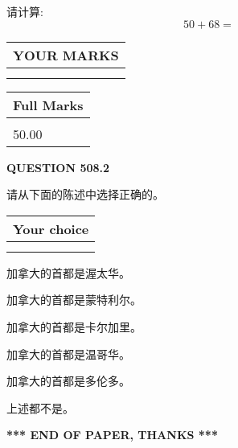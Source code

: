 \documentclass{ctexart}
\begin{document}
  
 
请计算:
\begin{equation}
50 +  %
68 = \nonumber
\end{equation}
 

 

 
  
\vspace{0.2in}
  
\noindent\begin{tabular}{|l|}
\hline
 YOUR MARKS  \\
\hline
 \\ 
 \\ 
\hline
\end{tabular}
\hspace{0.05in} \begin{tabular}{|l|}
\hline
 Full Marks  \\
\hline
 \\ 
50.00 \\
\hline
\end{tabular}
{\textbf{\Large{QUESTION
508.2 
}}}
  
  
请从下面的陈述中选择正确的。
  
  
\noindent\hspace{3.0in} \begin{tabular}{|l|}
\hline
Your choice \\
\hline
 \\ 
 \\ 
\hline
\end{tabular}
  
  
 
 
加拿大的首都是渥太华。
 
 
加拿大的首都是蒙特利尔。
 
 
加拿大的首都是卡尔加里。
 
 
加拿大的首都是温哥华。
 
 
加拿大的首都是多伦多。
 
 
 上述都不是。
 
 
   
   
 \vspace{0.2in}
 
   
   
   
   
\vspace{1.0in} 
{\textbf{\large{ *** END OF PAPER, THANKS *** }}} 
   
\end{document}
